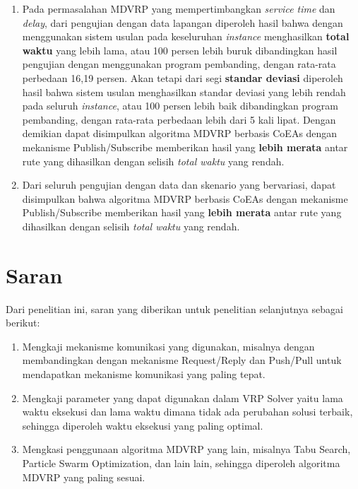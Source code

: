 \begin{enumerate}
	\item Pada permasalahan MDVRP yang mempertimbangkan \textit{service time} dan \textit{delay}, dari pengujian dengan data lapangan diperoleh hasil bahwa dengan menggunakan sistem usulan pada keseluruhan \textit{instance} menghasilkan \textbf{total waktu} yang lebih lama, atau 100 persen lebih buruk dibandingkan hasil pengujian dengan menggunakan program pembanding, dengan rata-rata perbedaan 16,19 persen. Akan tetapi dari segi \textbf{standar deviasi} diperoleh hasil bahwa sistem usulan menghasilkan standar deviasi yang lebih rendah pada seluruh \textit{instance}, atau 100 persen lebih baik dibandingkan program pembanding, dengan rata-rata perbedaan lebih dari 5 kali lipat. Dengan demikian dapat disimpulkan algoritma MDVRP berbasis CoEAs dengan mekanisme Publish/Subscribe memberikan hasil yang \textbf{lebih merata} antar rute yang dihasilkan dengan selisih \textit{total waktu} yang rendah.
	
	\item Dari seluruh pengujian dengan data dan skenario yang bervariasi, dapat disimpulkan bahwa algoritma MDVRP berbasis CoEAs dengan mekanisme Publish/Subscribe memberikan hasil yang \textbf{lebih merata} antar rute yang dihasilkan dengan selisih \textit{total waktu} yang rendah.
\end{enumerate}


\section{Saran}
Dari penelitian ini, saran yang diberikan untuk penelitian selanjutnya sebagai berikut:

\begin{enumerate}
	\item Mengkaji mekanisme komunikasi yang digunakan, misalnya dengan membandingkan dengan mekanisme Request/Reply dan Push/Pull untuk mendapatkan mekanisme komunikasi yang paling tepat.
	\item Mengkaji parameter yang dapat digunakan dalam VRP Solver yaitu lama waktu eksekusi dan lama waktu dimana tidak ada perubahan solusi terbaik, sehingga diperoleh waktu eksekusi yang paling optimal.
	\item Mengkasi penggunaan algoritma MDVRP yang lain, misalnya Tabu Search, Particle Swarm Optimization, dan lain lain, sehingga diperoleh algoritma MDVRP yang paling sesuai.
\end{enumerate}
